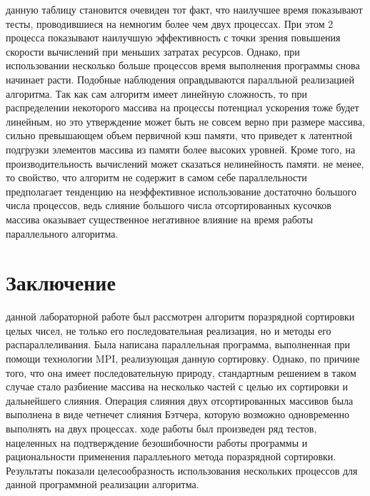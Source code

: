\documentclass[12pt]{report}
\begin{document}
 данную таблицу становится очевиден тот факт, что наилучшее время показывают тесты, проводившиеся на немногим более чем двух процессах. При этом 2 процесса показывают наилучшую эффективность с точки зрения повышения скорости вычислений при меньших затратах ресурсов. Однако, при использовании несколько больше процессов время выполнения программы снова начинает расти. Подобные наблюдения оправдываются паралльной реализацией алгоритма. Так как сам алгоритм имеет линейную сложность, то при распределении некоторого массива на процессы потенциал ускорения тоже будет линейным, но это утверждение может быть не совсем верно при размере массива, сильно превышающем объем первичной кэш памяти, что приведет к латентной подгрузки элементов массива из памяти более высоких уровней. Кроме того, на производительность вычислений может сказаться нелинейность памяти.
 не менее, то свойство, что алгоритм не содержит в самом себе параллельности предполагает тенденцию на неэффективное использование достаточно большого числа процессов, ведь слияние большого числа отсортированных кусочков массива оказывает существенное негативное влияние на время работы параллельного алгоритма.

\newpage


\section*{Заключение}
 данной лабораторной работе был рассмотрен алгоритм поразрядной сортировки целых чисел, не только его последовательная реализация, но и методы его распараллеливания. Была написана параллельная программа, выполненная при помощи технологии MPI, реализующая данную сортировку. Однако, по причине того, что она имеет последовательную природу, стандартным решением в таком случае стало разбиение массива на несколько частей с целью их сортировки и дальнейшего слияния. Операция слияния двух отсортированных массивов была выполнена в виде четнечет слияния Бэтчера, которую возможно одновременно выполнять на двух процессах.
 ходе работы был произведен ряд тестов, нацеленных на подтверждение безошибочности работы программы и рациональности применения параллеьного метода поразрядной сортировки. Результаты показали целесообразность использования нескольких процессов для данной программной реализации алгоритма.

\newpage
\end{document}
